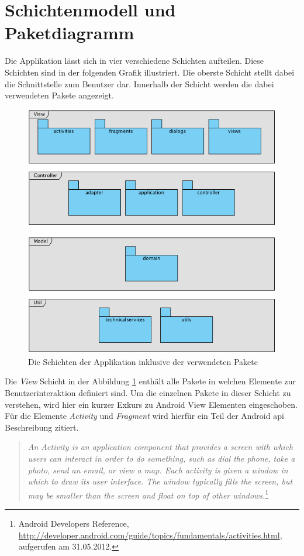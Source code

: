 \newpage

\section{Schichtenmodell und Paketdiagramm}
Die Applikation lässt sich in vier verschiedene Schichten aufteilen. Diese Schichten sind in der folgenden Grafik illustriert. Die oberste Schicht stellt dabei die Schnittstelle zum Benutzer dar. Innerhalb der Schicht werden die dabei verwendeten Pakete angezeigt.  
\begin{figure}[h!]
\caption{Die Schichten der Applikation inklusive der verwendeten Pakete}
\label{fig:layer}
\centering
\includegraphics[scale=0.9]{05bericht/images/packagediagram.png}
\end{figure} 

Die \textit{View} Schicht in der Abbildung \ref{fig:layer} enthält alle Pakete in welchen Elemente zur Benutzerinteraktion definiert sind. Um die einzelnen Pakete in dieser Schicht zu verstehen, wird hier ein kurzer Exkurs zu Android View Elementen eingeschoben. Für die Elemente \textit{Activity} und \textit{Fragment} wird hierfür ein Teil der Android \gls{api} Beschreibung zitiert.

\begin{quote}
\textit{An Activity is an application component that provides a screen with which users can interact in order to do something, such as dial the phone, take a photo, send an email, or view a map. Each activity is given a window in which to draw its user interface. The window typically fills the screen, but may be smaller than the screen and float on top of other windows.}\footnote{Android Developers Reference, \url{http://developer.android.com/guide/topics/fundamentals/activities.html}, aufgerufen am 31.05.2012.}
\end{quote}

